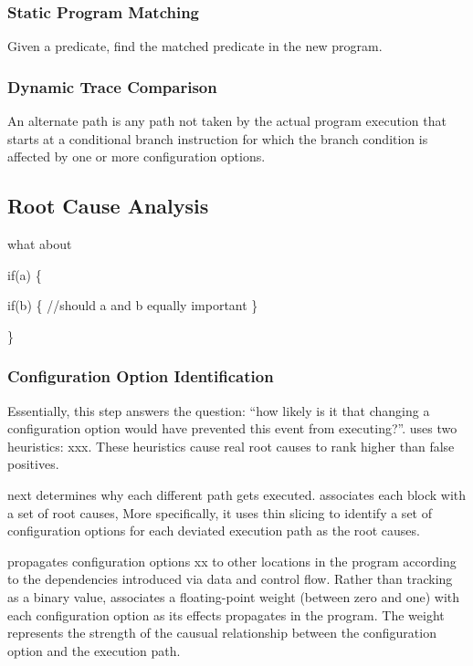 \subsubsection{Static Program Matching}

Given a predicate, find the matched predicate in the
new program.



\subsubsection{Dynamic Trace Comparison}

An alternate path is any path not taken by the actual
program execution that starts at a conditional
branch instruction for which the branch condition
is affected by one or more configuration options.

\subsection{Root Cause Analysis}

what about 

if(a) \{

    if(b) \{
        //should a and b equally important
     \}

    \}

\subsubsection{Configuration Option Identification}

Essentially, this step answers the question:
``how likely is it that changing a configuration
option would have prevented this event
from executing?''.
\ourtool uses two heuristics: xxx.
These heuristics cause real root causes to rank
higher than false positives.


\ourtool next determines why each different path
gets executed. \ourtool associates each block
with a set of root causes, More specifically,
it uses thin slicing to identify a
set of configuration options for each deviated
execution path as the root causes.


\ourtool propagates configuration options xx to
other locations in the program according to the
dependencies introduced via data and control flow.
Rather than tracking as a binary value, \ourtool
associates a floating-point weight (between
zero and one) with each configuration option
as its effects propagates in the program.
The weight represents the strength of the causual
relationship between the configuration option
and the execution path.


